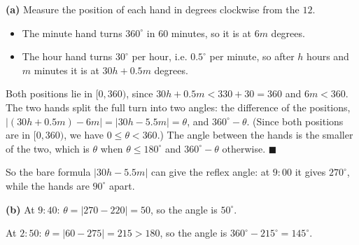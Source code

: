 \textbf{(a)} Measure the position of each hand in degrees clockwise from the $12$.
\begin{itemize}
\item The minute hand turns $360^\circ$ in $60$ minutes, so it is at $6m$ degrees.
\item The hour hand turns $30^\circ$ per hour, i.e. $0.5^\circ$ per minute, so after $h$ hours and $m$ minutes it is at $30h+0.5m$ degrees.
\end{itemize}
Both positions lie in $[0,360)$, since $30h+0.5m<330+30=360$ and $6m<360$. The two hands split the full turn into two angles: the difference of the positions, $\left|(30h+0.5m)-6m\right|=|30h-5.5m|=\theta$, and $360^\circ-\theta$. (Since both positions are in $[0,360)$, we have $0\le\theta<360$.) The angle between the hands is the smaller of the two, which is $\theta$ when $\theta\le180^\circ$ and $360^\circ-\theta$ otherwise. $\blacksquare$

So the bare formula $|30h-5.5m|$ can give the reflex angle: at $9{:}00$ it gives $270^\circ$, while the hands are $90^\circ$ apart.

\textbf{(b)} At $9{:}40$: $\theta=|270-220|=50$, so the angle is $\boxed{50^\circ}$.

At $2{:}50$: $\theta=|60-275|=215>180$, so the angle is $360^\circ-215^\circ=\boxed{145^\circ}$.

